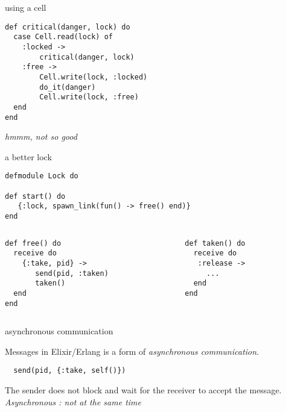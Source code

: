 \begin{frame}[fragile]{using a cell}

\pause\vspace{20pt}

\begin{verbatim}
def critical(danger, lock) do
  case Cell.read(lock) of
    :locked ->
        critical(danger, lock)
    :free ->
        Cell.write(lock, :locked)
        do_it(danger)
        Cell.write(lock, :free)
  end
end 
\end{verbatim}

\pause\vspace{20pt}
{\em hmmm, not so good}

\end{frame}

\begin{frame}[fragile]{a better lock}

\begin{verbatim}
defmodule Lock do

def start() do
   {:lock, spawn_link(fun() -> free() end)}
end
\end{verbatim}
\begin{columns}
  \begin{column}{0.5\linewidth}
\begin{verbatim}
def free() do
  receive do
    {:take, pid} ->
       send(pid, :taken)
       taken()
  end
end
\end{verbatim}
  \end{column}
  \begin{column}{0.5\linewidth}
\begin{verbatim}  
def taken() do
  receive do
   :release ->
     ...
  end
end

\end{verbatim}
  \end{column}
\end{columns}
\end{frame}


\begin{frame}[fragile]{asynchronous communication}

Messages in Elixir/Erlang is a form of {\em asynchronous communication}.

\pause\vspace{20pt}
\begin{verbatim}
  send(pid, {:take, self()})
\end{verbatim}

\pause\vspace{20pt}
The sender does not block and wait for the receiver to accept the message. 
\pause\vspace{20pt}
{\em Asynchronous : not at the same time}
\end{frame}

